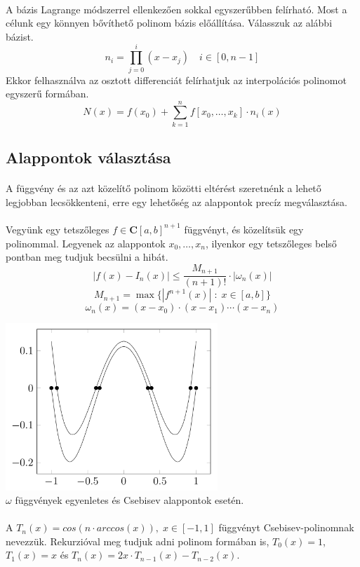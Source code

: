 \documentclass[12pt]{report}
\begin{document}
\paragraph{}
A bázis Lagrange módszerrel ellenkezően sokkal egyszerűbben felírható. Most a célunk egy könnyen bővíthető polinom bázis előállítása. Válasszuk az alábbi bázist.
$$
n_i = \prod_{j = 0}^{i}(x-x_j) \quad i \in [0, n - 1]
$$
Ekkor felhasználva az osztott differenciát felírhatjuk az interpolációs polinomot egyszerű formában.
$$
N(x) = f(x_0) + \sum_{k=1}^{n} f[x_0, \dots, x_k] \cdot n_i(x)
$$

\subsection{Alappontok választása}
\paragraph{}
A függvény és az azt közelítő polinom közötti eltérést szeretnénk a lehető legjobban lecsökkenteni, erre egy lehetőség az alappontok precíz megválasztása.
\paragraph{}
Vegyünk egy tetszőleges $f \in \mathbf{C}[a,b]^{n+1}$ függvényt, és közelítsük egy polinommal. Legyenek az alappontok $x_0, \dots, x_n$, ilyenkor egy tetszőleges belső pontban meg tudjuk becsülni a hibát.
$$
|f(x) - I_n(x)| \leq \frac{M_{n+1}}{(n+1)!} \cdot |\omega_n(x)|
$$
$$
M_{n+1} = \max\{|f^{n+1}(x)| \; : \; x \in [a,b]\} 
$$
$$
\omega_n(x) = (x-x_0)\cdot(x-x_1)\cdots(x-x_n)
$$
\begin{center}
\includegraphics[width=8cm]{pics/chebyshev_and_even}\\
{\footnotesize $\omega$ függvények egyenletes és Csebisev alappontok esetén.}
\end{center}
\paragraph{}
A $T_n(x) = cos(n \cdot arccos(x)), \; x \in [-1, 1]$ függvényt Csebisev-polinomnak nevezzük. Rekurzióval meg tudjuk adni polinom formában is, $T_0(x)=1$, $T_1(x) = x$ és $T_n(x) = 2x \cdot T_{n-1}(x)-T_{n-2}(x)$.
\end{document}
